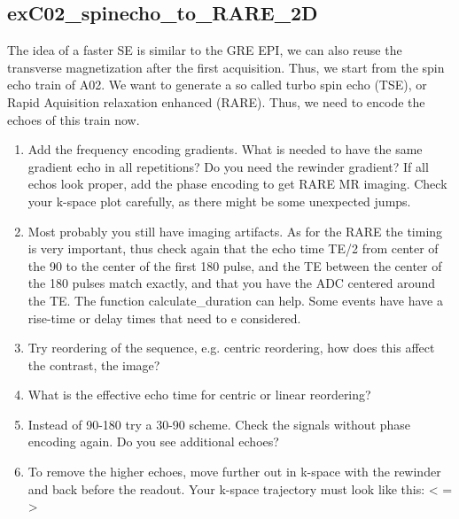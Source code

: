 \documentclass[a4paper,12pt]{extarticle}
\begin{document}
\subsection{exC02\_spinecho\_to\_RARE\_2D}
The idea of a faster SE is similar to the GRE EPI, we can also reuse the transverse magnetization after the first acquisition.
Thus, we start from the spin echo train of A02. We want to generate a so called turbo spin echo (TSE), or Rapid Aquisition relaxation enhanced (RARE). Thus, we need to encode the echoes of this train now.\\
\begin{enumerate}

\item Add the frequency encoding gradients. What is needed to have the same gradient echo in all repetitions? Do you need the rewinder gradient? If all echos look proper, add the phase encoding to get RARE MR imaging. Check your k-space plot carefully, as there might be some unexpected jumps. 

\item Most probably you still have imaging artifacts. As for the RARE the timing is very important, thus check again that the echo time TE/2 from center of the 90 to the center of the first 180 pulse, and the TE between the center of the 180 pulses match exactly, and that you have the ADC centered around the TE. The function calculate\_duration can help. Some events have have a rise-time or delay times that need to e considered.

\item Try reordering of the sequence, e.g. centric reordering, how does this affect the contrast, the image? 

\item What is the effective echo time for centric or linear reordering?

\item Instead of 90-180 try a 30-90 scheme. Check the signals without phase encoding again. Do you see additional echoes? \\

\item To remove the higher echoes, move further out in k-space with the rewinder and back before the readout. Your k-space trajectory must look like this: < = >



\end{enumerate}
\end{document}
